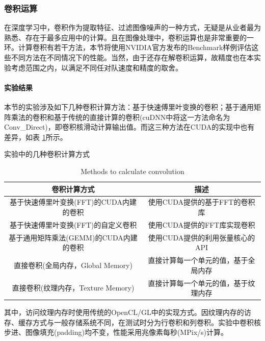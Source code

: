 \subsubsection{卷积运算}
\par 在深度学习中，卷积作为提取特征、过滤图像噪声的一种方式，无疑是从业者最为熟悉、存在于最多应用中的计算。且在图像处理中，卷积运算也是非常重要的一环。计算卷积有若干方法，本节将使用NVIDIA官方发布的Benchmark样例评估这些不同方法在不同情况下的性能。当然，由于还存在解卷积运算，故精度也在本实验考虑范围之内，以满足不同任对队速度和精度的取舍。
\paragraph{实验结果}
\par 本节的实验涉及如下几种卷积计算方法：基于快速傅里叶变换的卷积；基于通用矩阵乘法的卷积和基于传统的直接计算的卷积(cuDNN中将这一方法命名为Conv\_Direct)，即卷积核滑动计算输出值。而这三种方法在CUDA的实现中也有差异，如表 \ref{table-CONV}所示。
\begin{table}
	\centering
	\renewcommand{\thetable}{\arabic{section}-\arabic{table} }
	\renewcommand{\tablename}{表}
	\caption{实验中的几种卷积计算方式}
	\addtocounter{table}{-1}
	\renewcommand{\thetable}{\arabic{section}-\arabic{table} }
	\renewcommand{\tablename}{Table}
	\caption{Methods to calculate convolution}
	\begin{tabular}{cc}
		\toprule
		卷积计算方式	&	描述\\
		\midrule
		基于快速傅里叶变换(FFT)的CUDA内建的卷积 & 使用CUDA提供的基于FFT的卷积库\\
		基于快速傅里叶变换(FFT)的自定义卷积 & 使用CUDA提供的FFT库实现卷积\\
		基于通用矩阵乘法(GEMM)的CUDA内建的卷积 & 使用CUDA提供的利用张量核心的API\\
		直接卷积(全局内存，Global Memory) & 直接计算每一个单元的值，基于全局内存\\
		直接卷积(纹理内存，Texture Memory) & 直接计算每一个单元的值，基于纹理内存\\
		\bottomrule
	\end{tabular} \label{table-CONV} 
\end{table}
\par 其中，访问纹理内存时使用传统的OpenCL/GL中的实现方式。因纹理内存的访存、缓存方式与一般存储系统不同，在测试时分为行卷积和列卷积。实验中卷积核步进、图像填充(padding)均不变，性能采用兆像素每秒(MPix/s)计算。
